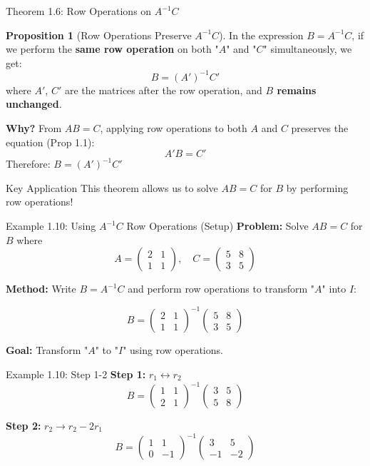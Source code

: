 \documentclass[10pt]{beamer}
\theoremstyle{definition}
\newtheorem{prop}{Proposition}[section]
\newcommand{\x}[1]{\alert{\textbf{#1}}}
\begin{document}
\begin{frame}{Theorem 1.6: Row Operations on $A^{-1}C$}
\begin{prop}[Row Operations Preserve $A^{-1}C$]
In the expression $B = A^{-1}C$, if we perform the \x{same row operation} on both "$A$" and "$C$" simultaneously, we get:
$$B = (A')^{-1}C'$$
where $A'$, $C'$ are the matrices after the row operation, and \x{$B$ remains unchanged}.
\end{prop}

\vspace{0.3cm}
\textbf{Why?} From $AB = C$, applying row operations to both $A$ and $C$ preserves the equation (Prop 1.1):
$$A'B = C'$$
Therefore: $B = (A')^{-1}C'$

\vspace{0.3cm}
\begin{alertblock}{Key Application}
This theorem allows us to solve $AB = C$ for $B$ by performing row operations!
\end{alertblock}
\end{frame}

\begin{frame}{Example 1.10: Using $A^{-1}C$ Row Operations (Setup)}
\textbf{Problem:} Solve $AB = C$ for $B$ where
$$A = \begin{pmatrix} 2 & 1 \\ 1 & 1 \end{pmatrix}, \quad C = \begin{pmatrix} 5 & 8 \\ 3 & 5 \end{pmatrix}$$

\textbf{Method:} Write $B = A^{-1}C$ and perform row operations to transform "$A$" into $I$:

$$B = \begin{pmatrix} 2 & 1 \\ 1 & 1 \end{pmatrix}^{-1} \begin{pmatrix} 5 & 8 \\ 3 & 5 \end{pmatrix}$$

\textbf{Goal:} Transform "$A$" to "$I$" using row operations.
\end{frame}

\begin{frame}{Example 1.10: Step 1-2}
\textbf{Step 1:} $r_1 \leftrightarrow r_2$
$$B = \begin{pmatrix} 1 & 1 \\ 2 & 1 \end{pmatrix}^{-1} \begin{pmatrix} 3 & 5 \\ 5 & 8 \end{pmatrix}$$

\textbf{Step 2:} $r_2 \to r_2 - 2r_1$
$$B = \begin{pmatrix} 1 & 1 \\ 0 & -1 \end{pmatrix}^{-1} \begin{pmatrix} 3 & 5 \\ -1 & -2 \end{pmatrix}$$
\end{frame}
\end{document}
